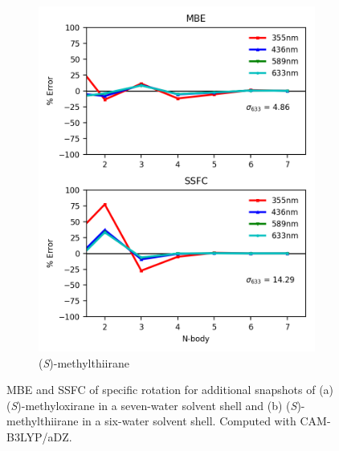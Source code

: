 \begin{figure}
\begin{subfigure}{0.5\textwidth}
                \includegraphics[scale=0.75]{p1/graphs/metthi2_6_cam_rot.png}
                \caption{(\textit{S})-methylthiirane}
                \label{metthi2_rot_cam}
            \end{subfigure}
            \caption{MBE and SSFC of specific rotation for additional snapshots of (a) (\textit{S})-methyloxirane in a seven-water solvent shell and (b) (\textit{S})-methylthiirane in a six-water solvent shell. Computed with CAM-B3LYP/aDZ.}
            \label{snaps_2}
        \end{figure}


